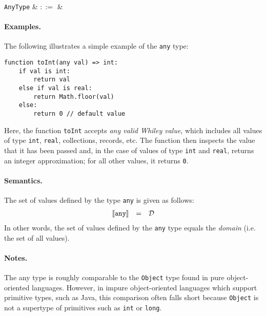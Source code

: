 \begin{syntax}
  \verb+AnyType+ & $::=$ &  \\
\end{syntax}

\paragraph{Examples.}  The following illustrates a simple example of the \lstinline{any} type:

\begin{lstlisting}
function toInt(any val) => int:
    if val is int:
        return val
    else if val is real:
        return Math.floor(val)
    else:
        return 0 // default value        
\end{lstlisting}

Here, the function \lstinline{toInt} accepts {\em any valid Whiley value}, which includes all values of type \lstinline{int}, \lstinline{real}, collections, records, etc.  The function then inspects the value that it has been passed and, in the case of values of type \lstinline{int} and \lstinline{real}, returns an integer approximation; for all other values, it returns \lstinline{0}.

\paragraph{Semantics.}  The set of values defined by the type \lstinline{any} is given as follows:
\begin{displaymath}
\begin{array}{rcl}
\llbracket{\tt any}\rrbracket & = & \mathcal{D}\\
\end{array}
\end{displaymath}
In other words, the set of values defined by the \lstinline{any} type equals the {\em domain} (i.e. the set of all values).

\paragraph{Notes.}  The any type is roughly comparable to the \lstinline{Object} type found in pure object-oriented languages.  However, in impure object-oriented languages which support primitive types, such as Java, this comparison often falls short because \lstinline{Object} is not a supertype of primitives such as \lstinline{int} or \lstinline{long}.


